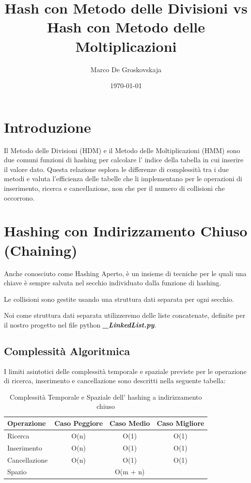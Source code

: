 \documentclass{article}
\title	{Hash con Metodo delle Divisioni vs Hash con Metodo delle Moltiplicazioni}
\author	{Marco De Groskovskaja}
\date	{\today}
\begin{document}
	\maketitle
	
	\section{Introduzione}
		
		Il Metodo delle Divisioni (HDM) e il Metodo delle Moltiplicazioni (HMM) sono due comuni funzioni di hashing per calcolare l' indice della tabella in cui inserire il valore dato. Questa relazione esplora le differenze di complessità
		tra i due metodi e valuta l’efficienza delle tabelle che li implementano per le operazioni di inserimento, ricerca e cancellazione, non che per il numero di collisioni che occorrono.
	
	\section{Hashing con Indirizzamento Chiuso (Chaining)}

		Anche conosciuto come Hashing Aperto, è un insieme di tecniche per le quali una chiave è sempre salvata nel secchio individuato dalla funzione di hashing.
		
		Le collisioni sono gestite usando una struttura dati separata per ogni secchio.
		
		Noi come struttura dati separata utilizzeremo delle liste concatenate, definite per il nostro progetto nel file python \textbf{\textit{\_LinkedList.py}}.

		\subsection{Complessità Algoritmica}
		I limiti asintotici delle complessità temporale e spaziale previste per le operazione di ricerca, inserimento e cancellazione sono descritti nella seguente tabella:
		
		\begin{table}[ht]
			\centering
			\begin{tabular}{|l|ccc|}
				\rowcolor[HTML]{C0C0C0}
				\hline
				Operazione    & Caso Peggiore & Caso Medio & Caso Migliore \\
				\hline
				Ricerca       & O(n)          & O(1)    & O(1)          \\
				\hline
				Inserimento   & O(n)          & O(1)    & O(1)          \\
				\hline
				Cancellazione & O(n)          & O(1)    & O(1)		   \\
				\hline
				\noalign{\smallskip}
				\noalign{\smallskip}
				\hline
				Spazio		  &			 	  & O(m + n) 	   &			   \\
				\hline
			\end{tabular}
			\caption{Complessità Temporale e Spaziale dell' hashing a indirizzamento chiuso}
		\end{table}
	
\end{document}
